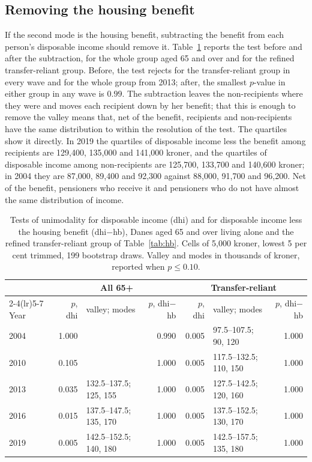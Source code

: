 \subsection{Removing the housing benefit}\label{sec:cf}

If the second mode is the housing benefit, subtracting the benefit from each person's disposable income should remove it. Table~\ref{tab:cf} reports the test before and after the subtraction, for the whole group aged 65 and over and for the refined transfer-reliant group. Before, the test rejects for the transfer-reliant group in every wave and for the whole group from 2013; after, the smallest $p$-value in either group in any wave is $0.99$. The subtraction leaves the non-recipients where they were and moves each recipient down by her benefit; that this is enough to remove the valley means that, net of the benefit, recipients and non-recipients have the same distribution to within the resolution of the test. The quartiles show it directly. In 2019 the quartiles of disposable income less the benefit among recipients are 129{,}400, 135{,}000 and 141{,}000 kroner, and the quartiles of disposable income among non-recipients are 125{,}700, 133{,}700 and 140{,}600 kroner; in 2004 they are 87{,}000, 89{,}400 and 92{,}300 against 88{,}000, 91{,}700 and 96{,}200. Net of the benefit, pensioners who receive it and pensioners who do not have almost the same distribution of income.

\begin{table}[t]
\centering\small
\caption{Tests of unimodality for disposable income (dhi) and for disposable income less the housing benefit (dhi$-$hb), Danes aged 65 and over living alone and the refined transfer-reliant group of Table~\ref{tab:hb}. Cells of 5{,}000 kroner, lowest 5 per cent trimmed, 199 bootstrap draws. Valley and modes in thousands of kroner, reported when $p\le0.10$.}\label{tab:cf}
\begin{tabular}{lrlrrlr}
\toprule
 & \multicolumn{3}{c}{All 65+} & \multicolumn{3}{c}{Transfer-reliant}\\
\cmidrule(lr){2-4}\cmidrule(lr){5-7}
Year & $p$, dhi & valley; modes & $p$, dhi$-$hb & $p$, dhi & valley; modes & $p$, dhi$-$hb\\
\midrule
2004 & 1.000 & & 0.990 & 0.005 & 97.5--107.5; 90, 120 & 1.000\\
2010 & 0.105 & & 1.000 & 0.005 & 117.5--132.5; 110, 150 & 1.000\\
2013 & 0.035 & 132.5--137.5; 125, 155 & 1.000 & 0.005 & 127.5--142.5; 120, 160 & 1.000\\
2016 & 0.015 & 137.5--147.5; 135, 170 & 1.000 & 0.005 & 137.5--152.5; 130, 170 & 1.000\\
2019 & 0.005 & 142.5--152.5; 140, 180 & 1.000 & 0.005 & 142.5--157.5; 135, 180 & 1.000\\
\bottomrule
\end{tabular}
\end{table}
